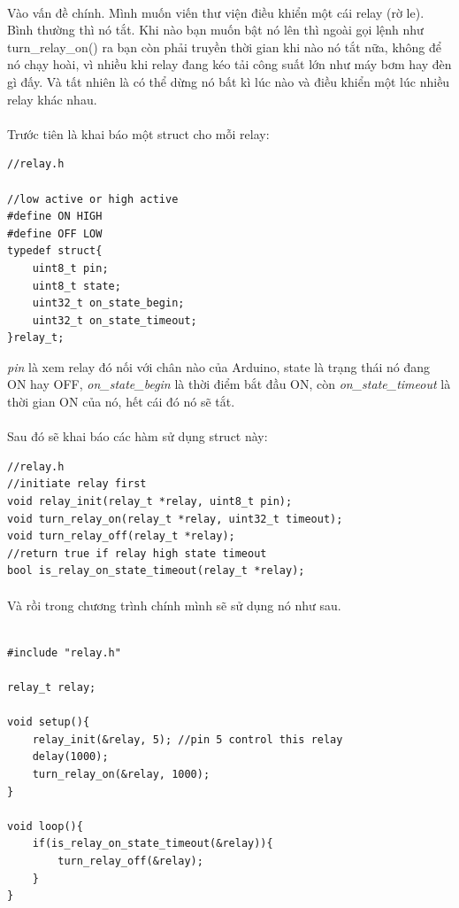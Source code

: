 \documentclass[12pt,a5paper]{book}
\begin{document}
\paragraph{}
Vào vấn đề chính. Mình muốn viến thư viện điều khiển một cái relay (rờ le). Bình thường thì nó tắt. Khi nào bạn muốn bật nó lên thì ngoài gọi lệnh như turn\_relay\_on() ra bạn còn phải truyền thời gian khi nào nó tắt nữa, không để nó chạy hoài, vì nhiều khi relay đang kéo tải công suất lớn như máy bơm hay đèn gì đấy. Và tất nhiên là có thể dừng nó bất kì lúc nào và điều khiển một lúc nhiều relay khác nhau.
\paragraph{}
Trước tiên là khai báo một struct cho mỗi relay:
\begin{lstlisting}
//relay.h

//low active or high active
#define ON HIGH
#define OFF LOW
typedef struct{
	uint8_t pin;
	uint8_t state;
	uint32_t on_state_begin;
	uint32_t on_state_timeout;
}relay_t;
\end{lstlisting}
\textit{pin} là xem relay đó nối với chân nào của Arduino, state là trạng thái nó đang ON hay OFF, \textit{on\_state\_begin} là thời điểm bắt đầu ON, còn \textit{on\_state\_timeout} là thời gian ON của nó, hết cái đó nó sẽ tắt.
\paragraph{}
Sau đó sẽ khai báo các hàm sử dụng struct này:
\begin{lstlisting}
//relay.h
//initiate relay first
void relay_init(relay_t *relay, uint8_t pin);
void turn_relay_on(relay_t *relay, uint32_t timeout);
void turn_relay_off(relay_t *relay);
//return true if relay high state timeout
bool is_relay_on_state_timeout(relay_t *relay);
\end{lstlisting}
\paragraph{}
Và rồi trong chương trình chính mình sẽ sử dụng nó như sau.
\begin{lstlisting}

#include "relay.h"

relay_t relay;

void setup(){
	relay_init(&relay, 5); //pin 5 control this relay
	delay(1000);
	turn_relay_on(&relay, 1000);
}

void loop(){
	if(is_relay_on_state_timeout(&relay)){
		turn_relay_off(&relay);
	}
}

\end{lstlisting}
\end{document}

